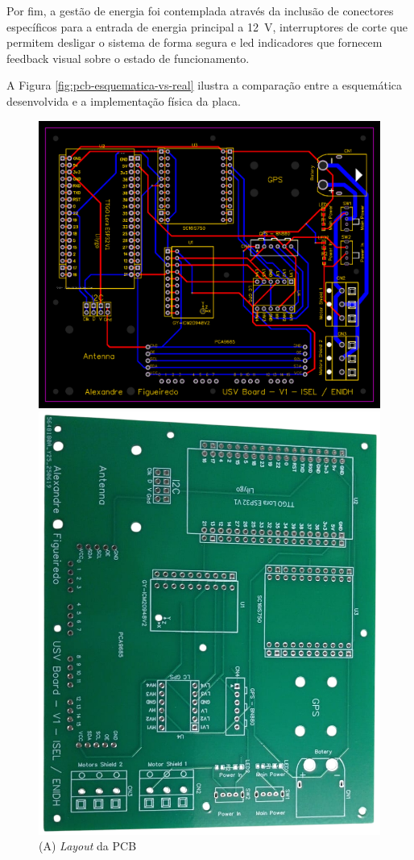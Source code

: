 Por fim, a gestão de energia foi contemplada através da inclusão de conectores específicos para a entrada de energia principal a 12~V, interruptores de corte que permitem desligar o sistema de forma segura e \gls{led} indicadores que fornecem feedback visual sobre o estado de funcionamento.  

A Figura \ref{fig:pcb-esquematica-vs-real} ilustra a comparação entre a esquemática desenvolvida e a implementação física da placa.

\begin{figure}[H]
    \centering
    \begin{minipage}{0.45\linewidth}
        \centering
        \includegraphics[width=0.80\linewidth]{figuras/PCB_PCB_USV-Board_2025-09-21.png}
        \caption*{(A) \emph{Layout} da PCB}
    \end{minipage}
    \hfill
    \begin{minipage}{0.40\linewidth}
        \centering
        \includegraphics[width=0.80\linewidth,angle=90]{figuras/pcb-real.png}

\end{minipage}
\end{figure}

